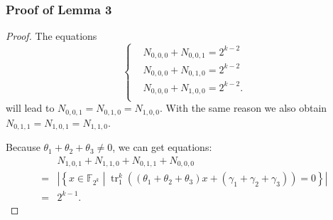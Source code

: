 \documentclass[
    aspectratio=169,                   %
]{beamer}
\newcommand{\F}{\mathbb{F}}
\newcommand{\tr}{\operatorname{tr}_1^k}
\begin{document}
        
        \begin{frame}
            \frametitle{Proof of Lemma 3}
          
            \begin{proof}
              The equations 
                \begin{equation}\label{eq:from_lemma_1}\left\{\begin{alignedat}{3}
                  &N_{0,0,0}+N_{0,0,1}=2^{k-2}\\
                  &N_{0,0,0}+N_{0,1,0}=2^{k-2}\\
                  &N_{0,0,0}+N_{1,0,0}=2^{k-2}.\\
                \end{alignedat}\right.\end{equation}
                will lead to $ N_{0,0,1}=N_{0,1,0}=N_{1,0,0} $. With the same reason we also obtain  $ N_{0,1,1}=N_{1,0,1}=N_{1,1,0} $. 
    
                Because $ \theta_1+\theta_2+\theta_3\ne 0 $, we can get equations: 
                \begin{align}\label{eq:sum_three_trace} 
                    &N_{1,0,1}+N_{1,1,0}+N_{0,1,1}+N_{0,0,0}\nonumber\\
                    =&\left\lvert\left\{x\in\F_{2^k}\middle|\tr\left(\left(\theta_1+\theta_2+\theta_3\right)x+\left(\gamma_1+\gamma_2+\gamma_3\right)\right)=0\right\}\right\rvert\\
                    =&2^{k-1}.\nonumber
                \end{align}
            \end{proof}
        \end{frame}   
\end{document}
